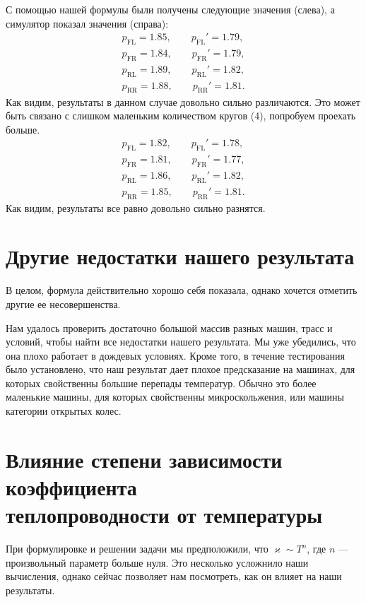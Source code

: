 \documentclass[a4paper,12pt]{report}
\begin{document}
        С помощью нашей формулы были получены следующие значения (слева), а симулятор показал значения (справа):
        \begin{gather*}
            p_\text{FL}=1.85, \qquad p_\text{FL}'=1.79,\\
            p_\text{FR}=1.84, \qquad p_\text{FR}'=1.79,\\
            p_\text{RL}=1.89, \qquad p_\text{RL}'=1.82,\\
            p_\text{RR}=1.88, \qquad p_\text{RR}'=1.81.
        \end{gather*}
        Как видим, результаты в данном случае довольно сильно различаются. Это может быть связано с слишком маленьким количеством кругов (4), попробуем проехать больше.
        \begin{gather*}
            p_\text{FL}=1.82, \qquad p_\text{FL}'=1.78,\\
            p_\text{FR}=1.81, \qquad p_\text{FR}'=1.77,\\
            p_\text{RL}=1.86, \qquad p_\text{RL}'=1.82,\\
            p_\text{RR}=1.85, \qquad p_\text{RR}'=1.81.
        \end{gather*}
        Как видим, результаты все равно довольно сильно разнятся.

    \section{Другие недостатки нашего результата}
        В целом, формула действительно хорошо себя показала, однако хочется отметить другие ее несовершенства.

        Нам удалось проверить достаточно большой массив разных машин, трасс и условий, чтобы найти все недостатки нашего результата. Мы уже убедились, что она плохо работает в дождевых условиях. Кроме того, в течение тестирования было установлено, что наш результат дает плохое предсказание на машинах, для которых свойственны большие перепады температур. Обычно это более маленькие машины, для которых свойственны микроскольжения, или машины категории открытых колес.
    \section{Влияние степени зависимости коэффициента\\ теплопроводности от температуры}
        При формулировке и решении задачи мы предположили, что $\varkappa \sim T^n$, где $n$ --- произвольный параметр больше нуля. Это несколько усложнило наши вычисления, однако сейчас позволяет нам посмотреть, как он влияет на наши результаты. 
\end{document}
